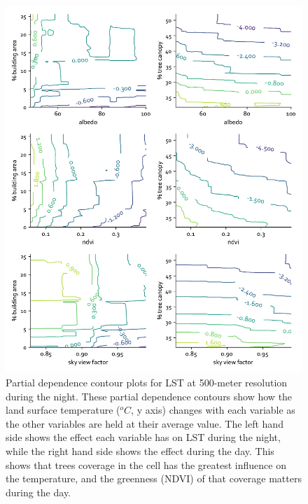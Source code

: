 \documentclass[final,3p,times,twocolumn,sort&compress]{elsarticle}
\begin{document}
\begin{figure}[h]
    \centering
    \includegraphics[width=\linewidth]{fig/report/pdp_2d_night_500.pdf}
    \caption[Partial dependence contour plots for LST at 500-meter resolution during the night]{
    Partial dependence contour plots for LST at 500-meter resolution during the night.
    These partial dependence contours show how the land surface temperature ($^oC$, y axis) changes with each variable as the other variables are held at their average value. The left hand side shows the effect each variable has on LST during the night, while the right hand side shows the effect during the day. This shows that trees coverage in the cell has the greatest influence on the temperature, and the greenness (NDVI) of that coverage matters during the day.
    }
    \label{fig:pdp_2dnight_500}
\end{figure}
\end{document}

